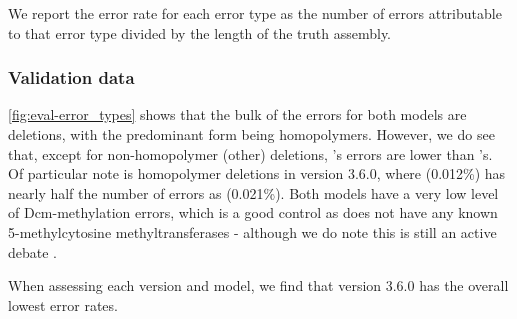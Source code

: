 We report the error rate for each error type as the number of errors attributable to that error type divided by the length of the truth assembly.

\subsubsection{Validation data}

\autoref{fig:eval-error_types} shows that the bulk of the errors for both models are deletions, with the predominant form being homopolymers. However, we do see that, except for non-homopolymer (other) deletions, \tubby{}'s errors are lower than \guppy{}'s. Of particular note is homopolymer deletions in version 3.6.0, where \tubby{} (0.012\%) has nearly half the number of errors as \guppy{} (0.021\%). Both models have a very low level of Dcm-methylation errors, which is a good control as \mtb{} does not have any known 5-methylcytosine methyltransferases - although we do note this is still an active debate \cite{Danjuma2017}.

When assessing each version and model, we find that \tubby{} version 3.6.0 has the overall lowest error rates.

